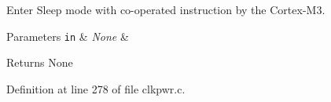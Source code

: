 Enter Sleep mode with co-\/operated instruction by the Cortex-\/\+M3. 


\begin{DoxyParams}[1]{Parameters}
\mbox{\tt in}  & {\em None} & \\
\hline
\end{DoxyParams}
\begin{DoxyReturn}{Returns}
None 
\end{DoxyReturn}


Definition at line 278 of file clkpwr.\+c.


